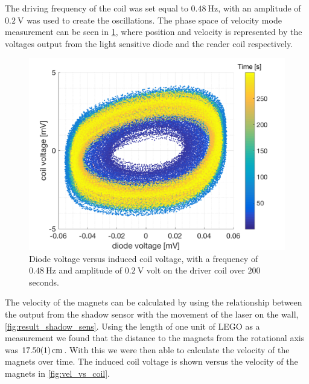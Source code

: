 \documentclass[english,a4paper,12pt,reprint]{revtex4-1}
\begin{document}
The driving frequency of the coil was set equal to $\SI{0.48}{\hertz}$, with an amplitude of $\SI{0.2}{\volt}$ was used to create the oscillations. The phase space of velocity mode measurement can be seen in \cref{fig:phase_space}, where position and velocity is represented by the voltages output from the light sensitive diode and the reader coil respectively.
\begin{figure}[htpb]
    \centering
    \includegraphics[scale=0.44]{phasespace.png}
    \caption{Diode voltage versus induced coil voltage, with a frequency of $\SI{0.48}{\hertz}$ and amplitude of $\SI{0.2}{\volt}$ volt on the driver coil over $200$ seconds.}
    \label{fig:phase_space}
\end{figure}
The velocity of the magnets can be calculated by using the relationship between the output from the shadow sensor with the movement of the laser on the wall, \vref{fig:result_shadow_sens}. Using the length of one unit of LEGO as a measurement we found that the distance to the magnets from the rotational axis was $\SI{17.50\pm0.01}{\centi\meter}$. With this we were then able to calculate the velocity of the magnets over time. The induced coil voltage is shown versus the velocity of the magnets in \vref{fig:vel_vs_coil}.
\end{document}
